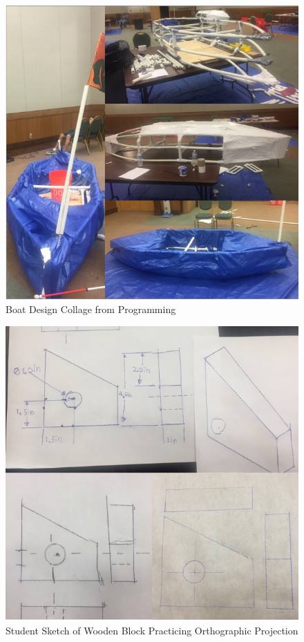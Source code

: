 \documentclass[11.5pt]{sig-alternate} %
\begin{document}
\begin{large}
\begin{figure}[h]
    \centering
    \includegraphics[width=1\linewidth]{fig1.png}
    \caption{Boat Design Collage from Programming}
\end{figure}

\begin{figure}[!h]
    \centering
    \includegraphics[width=1\linewidth]{fig2.png}
    \caption{Student Sketch of Wooden Block Practicing Orthographic Projection}
\end{figure}


\end{large}
\end{document}
